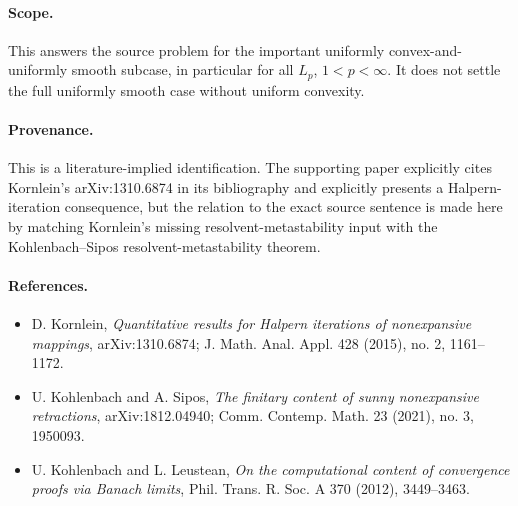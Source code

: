 \documentclass[11pt]{article}
\begin{document}
\paragraph{Scope.}
This answers the source problem for the important uniformly convex-and-uniformly smooth subcase, in particular for all $L_p$, $1<p<\infty$. It does not settle the full uniformly smooth case without uniform convexity.

\paragraph{Provenance.}
This is a literature-implied identification. The supporting paper explicitly cites Kornlein's arXiv:1310.6874 in its bibliography and explicitly presents a Halpern-iteration consequence, but the relation to the exact source sentence is made here by matching Kornlein's missing resolvent-metastability input with the Kohlenbach--Sipos resolvent-metastability theorem.

\paragraph{References.}
\begin{itemize}
\item D. Kornlein, \emph{Quantitative results for Halpern iterations of nonexpansive mappings}, arXiv:1310.6874; J. Math. Anal. Appl. 428 (2015), no. 2, 1161--1172.
\item U. Kohlenbach and A. Sipos, \emph{The finitary content of sunny nonexpansive retractions}, arXiv:1812.04940; Comm. Contemp. Math. 23 (2021), no. 3, 1950093.
\item U. Kohlenbach and L. Leustean, \emph{On the computational content of convergence proofs via Banach limits}, Phil. Trans. R. Soc. A 370 (2012), 3449--3463.
\end{itemize}
\end{document}
